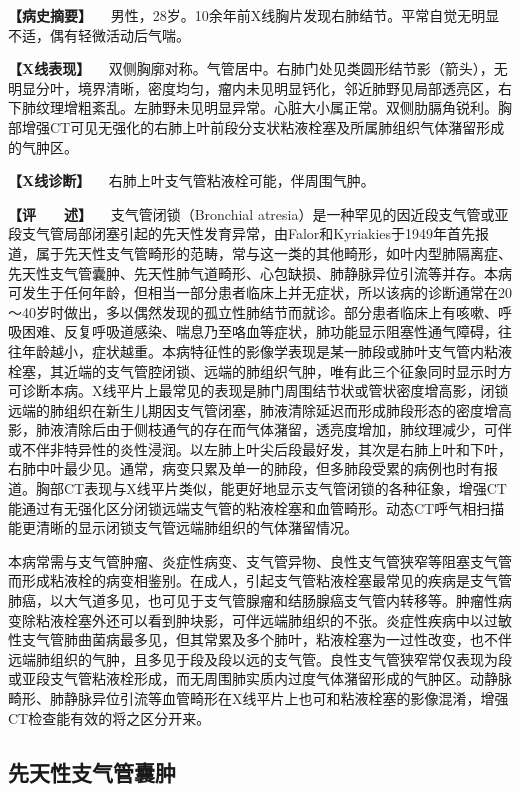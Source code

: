 \textbf{【病史摘要】}
　男性，28岁。10余年前X线胸片发现右肺结节。平常自觉无明显不适，偶有轻微活动后气喘。

\textbf{【X线表现】}
　双侧胸廓对称。气管居中。右肺门处见类圆形结节影（箭头），无明显分叶，境界清晰，密度均匀，瘤内未见明显钙化，邻近肺野见局部透亮区，右下肺纹理增粗紊乱。左肺野未见明显异常。心脏大小属正常。双侧肋膈角锐利。胸部增强CT可见无强化的右肺上叶前段分支状粘液栓塞及所属肺组织气体潴留形成的气肿区。

\textbf{【X线诊断】} 　右肺上叶支气管粘液栓可能，伴周围气肿。

\textbf{【评　　述】} 　支气管闭锁（Bronchial
atresia）是一种罕见的因近段支气管或亚段支气管局部闭塞引起的先天性发育异常，由Falor和Kyriakies于1949年首先报道，属于先天性支气管畸形的范畴，常与这一类的其他畸形，如叶内型肺隔离症、先天性支气管囊肿、先天性肺气道畸形、心包缺损、肺静脉异位引流等并存。本病可发生于任何年龄，但相当一部分患者临床上并无症状，所以该病的诊断通常在20～40岁时做出，多以偶然发现的孤立性肺结节而就诊。部分患者临床上有咳嗽、呼吸困难、反复呼吸道感染、喘息乃至咯血等症状，肺功能显示阻塞性通气障碍，往往年龄越小，症状越重。本病特征性的影像学表现是某一肺段或肺叶支气管内粘液栓塞，其近端的支气管腔闭锁、远端的肺组织气肿，唯有此三个征象同时显示时方可诊断本病。X线平片上最常见的表现是肺门周围结节状或管状密度增高影，闭锁远端的肺组织在新生儿期因支气管闭塞，肺液清除延迟而形成肺段形态的密度增高影，肺液清除后由于侧枝通气的存在而气体潴留，透亮度增加，肺纹理减少，可伴或不伴非特异性的炎性浸润。以左肺上叶尖后段最好发，其次是右肺上叶和下叶，右肺中叶最少见。通常，病变只累及单一的肺段，但多肺段受累的病例也时有报道。胸部CT表现与X线平片类似，能更好地显示支气管闭锁的各种征象，增强CT能通过有无强化区分闭锁远端支气管的粘液栓塞和血管畸形。动态CT呼气相扫描能更清晰的显示闭锁支气管远端肺组织的气体潴留情况。

本病常需与支气管肿瘤、炎症性病变、支气管异物、良性支气管狭窄等阻塞支气管而形成粘液栓的病变相鉴别。在成人，引起支气管粘液栓塞最常见的疾病是支气管肺癌，以大气道多见，也可见于支气管腺瘤和结肠腺癌支气管内转移等。肿瘤性病变除粘液栓塞外还可以看到肿块影，可伴远端肺组织的不张。炎症性疾病中以过敏性支气管肺曲菌病最多见，但其常累及多个肺叶，粘液栓塞为一过性改变，也不伴远端肺组织的气肿，且多见于段及段以远的支气管。良性支气管狭窄常仅表现为段或亚段支气管粘液栓形成，而无周围肺实质内过度气体潴留形成的气肿区。动静脉畸形、肺静脉异位引流等血管畸形在X线平片上也可和粘液栓塞的影像混淆，增强CT检查能有效的将之区分开来。

\subsection{先天性支气管囊肿}

